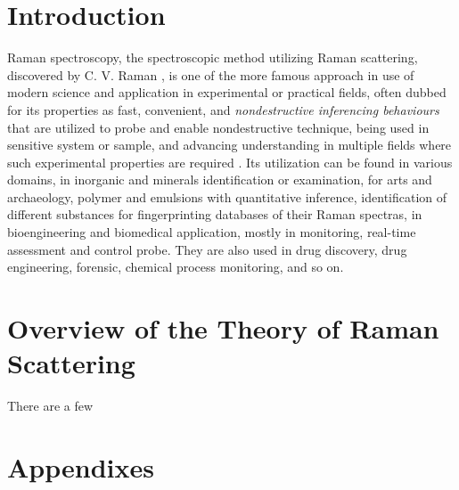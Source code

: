 \documentclass[%
 aip,
 jmp,%
 amsmath,amssymb,
 reprint,%
]{revtex4-2}
\begin{document}
\maketitle


\section{Introduction}\label{sec:intro}

Raman spectroscopy, the spectroscopic method utilizing Raman scattering, discovered by C. V. Raman \cite{raman_new_1928}, is one of the more famous approach in use of modern science and application in experimental or practical fields, often dubbed for its properties as fast, convenient, and \textit{nondestructive inferencing behaviours} that are utilized to probe and enable nondestructive technique, being used in sensitive system or sample, and advancing understanding in multiple fields where such experimental properties are required \cite{Chandra2024RamanBiologicalResearch}. Its utilization can be found in various domains, in inorganic and minerals identification or examination, for arts and archaeology, polymer and emulsions with quantitative inference, identification of different substances for fingerprinting databases of their Raman spectras, in bioengineering \cite{MullerDavidBioEngineering2024} and biomedical \cite{Sharma2025SERSBiomedical,Haugen2026InVivoRaman} application, mostly in monitoring, real-time assessment and control probe. They are also used in drug discovery, drug engineering, forensic, chemical process monitoring, and so on\cite{hollas2004modern,EwenFrontRamanModern}.

\section{Overview of the Theory of Raman Scattering}

There are a few 

\clearpage

\appendix

\section{Appendixes}



\clearpage

\end{document}
